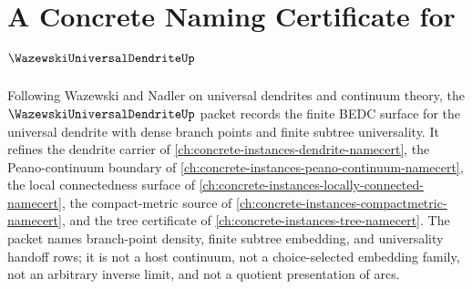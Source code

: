 \chapter{A Concrete Naming Certificate for $\WazewskiUniversalDendriteUp$}
\label{ch:concrete-instances-wazewski-universal-dendrite-namecert}

Following Wazewski and Nadler on universal dendrites and continuum theory, the $\WazewskiUniversalDendriteUp$ packet records the finite BEDC surface for the universal dendrite with dense branch points and finite subtree universality. It refines the dendrite carrier of \autoref{ch:concrete-instances-dendrite-namecert}, the Peano-continuum boundary of \autoref{ch:concrete-instances-peano-continuum-namecert}, the local connectedness surface of \autoref{ch:concrete-instances-locally-connected-namecert}, the compact-metric source of \autoref{ch:concrete-instances-compactmetric-namecert}, and the tree certificate of \autoref{ch:concrete-instances-tree-namecert}. The packet names branch-point density, finite subtree embedding, and universality handoff rows; it is not a host continuum, not a choice-selected embedding family, not an arbitrary inverse limit, and not a quotient presentation of arcs.

